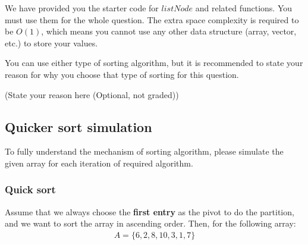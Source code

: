 \documentclass[11pt]{exam}
\begin{document}
We have provided you the starter code for $listNode$ and related functions. You must use them for the whole question. The extra space complexity is required to be $O(1)$, which means you cannot use any other data structure (array, vector, etc.) to store your values.

You can use either type of sorting algorithm, but it is recommended to state your reason for why you choose that type of sorting for this question.

\begin{solution}
(State your reason here (Optional, not graded))
\end{solution}


\subsection{Quicker sort simulation}
To fully understand the mechanism of sorting algorithm, please simulate the given array for each iteration of required algorithm.

\subsubsection{Quick sort}

Assume that we always choose the \textbf{first entry} as the pivot to do the partition, and we want to sort the array in ascending order. Then, for the following array:
\begin{align*}
A = \{6, 2, 8, 10, 3, 1, 7\}
\end{align*}
\end{document}
